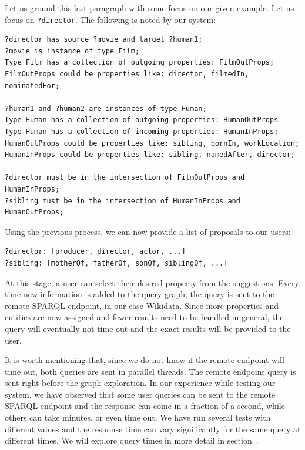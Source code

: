 \begin{example}
Let us ground this last paragraph with some focus on our given example. Let us focus on \texttt{?director}. The following is noted by our system:

\begin{verbatim}
?director has source ?movie and target ?human1;
?movie is instance of type Film;
Type Film has a collection of outgoing properties: FilmOutProps;
FilmOutProps could be properties like: director, filmedIn, nominatedFor;

?human1 and ?human2 are instances of type Human;
Type Human has a collection of outgoing properties: HumanOutProps
Type Human has a collection of incoming properties: HumanInProps;
HumanOutProps could be properties like: sibling, bornIn, workLocation;
HumanInProps could be properties like: sibling, namedAfter, director;

?director must be in the intersection of FilmOutProps and HumanInProps;
?sibling must be in the intersection of HumanInProps and HumanOutProps;
\end{verbatim}

Using the previous process, we can now provide a list of proposals to our users:
\begin{verbatim}
?director: [producer, director, actor, ...]
?sibling: [motherOf, fatherOf, sonOf, siblingOf, ...]
\end{verbatim}

At this stage, a user can select their desired property from the suggestions. 
Every time new information is added to the query graph, the query is sent to the remote SPARQL endpoint, in our case Wikidata. 
Since more properties and entities are now assigned and fewer results need to be handled in general, the query will eventually not time out and the exact results will be provided to the user.

\end{example}

It is worth mentioning that, since we do not know if the remote endpoint will time out, both queries are sent in parallel threads. The remote endpoint query is sent right before the graph exploration. 
In our experience while testing our system, we have observed that some user queries can be sent to the remote SPARQL endpoint and the response can come in a fraction of a second, while others can take minutes, or even time out. 
We have run several tests with different values and the response time can vary significantly for the same query at different times. We will explore query times in more detail in section~.


